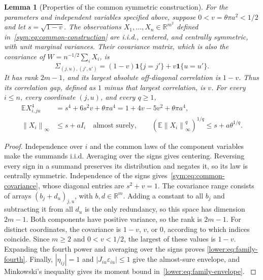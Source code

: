 \documentclass[11pt,letterpaper]{article}
\newenvironment{recovered}{\color{magenta}}{}
\newtheorem{lemma}{Lemma}
\theoremstyle{remark}
\newcommand{\E}{\mathbb E}
\newcommand{\R}{\mathbb R}
\newcommand{\norm}[1]{\left\lVert#1\right\rVert}
\newcommand{\ind}{\mathbf 1}
\begin{document}
\begin{recovered}
\begin{lemma}[Properties of the common symmetric construction]
\label{lower:family-properties}
For the parameters and independent variables specified above, suppose
\(0<v=\theta\pi a^2<1/2\) and let \(s=\sqrt{1-v}\).
The observations \(X_1,\ldots,X_n\in\R^{m^2}\) defined
in~\eqref{sym:eq:common-construction} are i.i.d., centered, and
centrally symmetric, with unit marginal variances. Their covariance
matrix, which is also the covariance of \(W=n^{-1/2}\sum_iX_i\), is
\begin{equation}
 \Sigma_{(j,u),(j',u')}=(1-v)\ind\{j=j'\}+v\ind\{u=u'\}.
 \label{sym:eq:common-covariance}
\end{equation}
It has rank \(2m-1\), and its largest absolute off-diagonal
correlation is \(1-v\). Thus its \emph{correlation gap}, defined as
\(1\) minus that largest correlation, is \(v\).
For every \(i\le n\), every coordinate \((j,u)\), and every \(q\ge1\),
\begin{align}
 \E X_{i,ju}^4
 &=s^4+6s^2v+\theta\pi a^4
   =1+4v-5v^2+\theta\pi a^4,\label{lower:eq:family-fourth}\\
 \norm{X_i}_\infty&\le s+aI_i\quad\text{almost surely},\qquad
 (\E\norm{X_i}_\infty^q)^{1/q}\le s+a\theta^{1/q}.
 \label{lower:eq:family-envelope}
\end{align}
\end{lemma}
\end{recovered}

\begin{proof}
\begin{recovered}
Independence over \(i\) and the common laws of the component variables
make the summands i.i.d. Averaging over the signs gives centering.
Reversing every sign in a summand preserves its distribution and
negates it, so its law is centrally symmetric.
Independence of the signs gives~\eqref{sym:eq:common-covariance},
whose diagonal entries are \(s^2+v=1\).
\end{recovered}
The covariance range consists of
arrays \((b_j+d_u)_{j,u}\), with \(b,d\in\R^m\).
Adding a constant to all \(b_j\) and subtracting it from all \(d_u\)
is the only redundancy, so this space has dimension \(2m-1\).
Both components have positive variance, so the rank is \(2m-1\).
\begin{recovered}
For distinct coordinates, the covariance is \(1-v\), \(v\), or
\(0\), according to which indices coincide. Since \(m\ge2\) and
\(0<v<1/2\), the largest of these values is \(1-v\).
Expanding the fourth power and averaging over the signs proves
\eqref{lower:eq:family-fourth}. Finally, \(|\eta_{ij}|=1\) and
\(|J_{iu}\varepsilon_{iu}|\le1\) give the almost-sure envelope,
and Minkowski's inequality gives its moment bound
in~\eqref{lower:eq:family-envelope}.
\end{recovered}
\end{proof}
\end{document}
